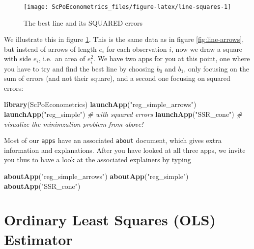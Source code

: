 \documentclass[]{book}
\newenvironment{Shaded}{\begin{snugshade}}{\end{snugshade}}
\newcommand{\KeywordTok}[1]{\textcolor[rgb]{0.13,0.29,0.53}{\textbf{#1}}}
\newcommand{\StringTok}[1]{\textcolor[rgb]{0.31,0.60,0.02}{#1}}
\newcommand{\CommentTok}[1]{\textcolor[rgb]{0.56,0.35,0.01}{\textit{#1}}}
\newcommand{\NormalTok}[1]{#1}
\begin{document}
\begin{figure}

{\centering \texttt{[image: ScPoEconometrics\_files/figure-latex/line-squares-1]} 

}

\caption{The best line and its SQUARED errors}\label{fig:line-squares}
\end{figure}

We illustrate this in figure \ref{fig:line-squares}. This is the same
data as in figure \ref{fig:line-arrows}, but instead of arrows of length
\(e_i\) for each observation \(i\), now we draw a square with side
\(e_i\), i.e.~an area of \(e_i^2\). We have two apps for you at this
point, one where you have to try and find the best line by choosing
\(b_0\) and \(b_1\), only focusing on the sum of errors (and not their
square), and a second one focusing on squared errors:

\begin{Shaded}
\begin{Highlighting}[]
\KeywordTok{library}\NormalTok{(ScPoEconometrics)}
\KeywordTok{launchApp}\NormalTok{(}\StringTok{"reg_simple_arrows"}\NormalTok{)}
\KeywordTok{launchApp}\NormalTok{(}\StringTok{"reg_simple"}\NormalTok{) }\CommentTok{# with squared errors}
\KeywordTok{launchApp}\NormalTok{(}\StringTok{"SSR_cone"}\NormalTok{) }\CommentTok{# visualize the minimzation problem from above!}
\end{Highlighting}
\end{Shaded}

Most of our \texttt{apps} have an associated \texttt{about} document,
which gives extra information and explanations. After you have looked at
all three apps, we invite you thus to have a look at the associated
explainers by typing

\begin{Shaded}
\begin{Highlighting}[]
\KeywordTok{aboutApp}\NormalTok{(}\StringTok{"reg_simple_arrows"}\NormalTok{)}
\KeywordTok{aboutApp}\NormalTok{(}\StringTok{"reg_simple"}\NormalTok{) }
\KeywordTok{aboutApp}\NormalTok{(}\StringTok{"SSR_cone"}\NormalTok{) }
\end{Highlighting}
\end{Shaded}

\section{Ordinary Least Squares (OLS) Estimator}\label{OLS}
\end{document}
